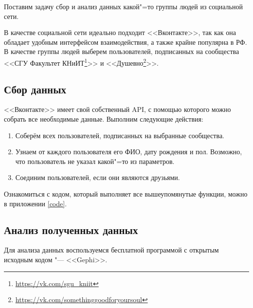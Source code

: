 Поставим задачу сбор и анализ данных какой"=то группы людей из социальной сети.

В качестве социальной сети идеально подходит <<Вконтакте>>, так как она обладает удобным интерфейсом взаимодействия, а также крайне популярна в РФ. В качестве группы людей выберем  пользователей, подписанных на сообщества <<СГУ Факультет КНиИТ\footnote{\url{https://vk.com/sgu_kniit}}>> и <<Душевно\footnote{\url{https://vk.com/somethinggoodforyoursoul}}>>.

\subsection{Сбор данных}
<<Вконтакте>> имеет свой собственный API\cite{vk}, с помощью которого можно собрать все необходимые данные. Выполним следующие действия:
\begin{enumerate}[label = \arabic*)]
    \item Соберём всех пользователей, подписанных на выбранные сообщества.
    \item Узнаем от каждого пользователя его ФИО, дату рождения и пол. Возможно, что пользователь не указал какой"=то из параметров.
    \item Соединим пользователей, если они являются друзьями.
\end{enumerate}




Ознакомиться с кодом, который выполняет все вышеупомянутые функции, можно в приложении \ref{code}.

\subsection{Анализ полученных данных}
Для анализа данных воспользуемся бесплатной программой с открытым исходным кодом "--- <<Gephi>>.

